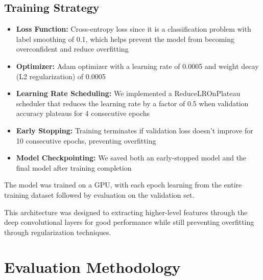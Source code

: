 \documentclass[10pt]{article}
\begin{document}
\begin{itemize}
    \subsection{Training Strategy}

    \begin{itemize}
        \item \textbf{Loss Function:} Cross-entropy loss since it is a classification problem with label smoothing of 0.1, which helps prevent the model from becoming overconfident and reduce overfitting
        
        \item \textbf{Optimizer:} Adam optimizer with a learning rate of 0.0005 and weight decay (L2 regularization) of 0.0005
        
        \item \textbf{Learning Rate Scheduling:} We implemented a ReduceLROnPlateau scheduler that reduces the learning rate by a factor of 0.5 when validation accuracy plateaus for 4 consecutive epochs
        
        \item \textbf{Early Stopping:} Training terminates if validation loss doesn't improve for 10 consecutive epochs, preventing overfitting
        
        \item \textbf{Model Checkpointing:} We saved both an early-stopped model and the final model after training completion
    \end{itemize}

    The model was trained on a GPU, with each epoch learning from the entire training dataset followed by evaluation on the validation set.
\end{itemize}

This architecture was designed to extracting higher-level features through the deep convolutional layers for good performance while still preventing overfitting through regularization techniques.





\section{Evaluation Methodology}
\end{document}
